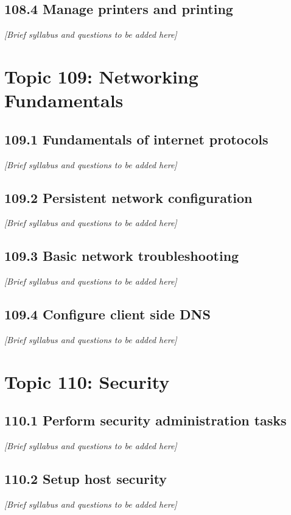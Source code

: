 \documentclass[12pt,a4paper]{report}
\begin{document}
\section{108.4 Manage printers and printing}
\textit{[Brief syllabus and questions to be added here]}

\chapter{Topic 109: Networking Fundamentals}
\section{109.1 Fundamentals of internet protocols}
\textit{[Brief syllabus and questions to be added here]}

\section{109.2 Persistent network configuration}
\textit{[Brief syllabus and questions to be added here]}

\section{109.3 Basic network troubleshooting}
\textit{[Brief syllabus and questions to be added here]}

\section{109.4 Configure client side DNS}
\textit{[Brief syllabus and questions to be added here]}

\chapter{Topic 110: Security}
\section{110.1 Perform security administration tasks}
\textit{[Brief syllabus and questions to be added here]}

\section{110.2 Setup host security}
\textit{[Brief syllabus and questions to be added here]}
\end{document}
